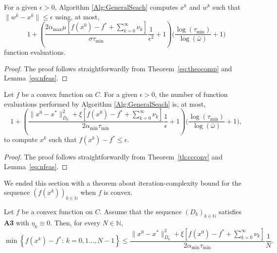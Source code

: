 \begin{theorem}
	For a given $\epsilon>0$, Algorithm \ref{Alg:GeneralSeach} computes $x^k$ and $w^k$ such that $\|  w^{k}-x^{k}\|\leq \epsilon$ using,  at most,
	$$1+\left({\frac{2{\alpha_{\max}}\mu\left[f(x^0)-f^* +\sum_{k= 0}^{\infty}\nu_k\right] }{\sigma \tau_{\min}}} \frac{1}{\epsilon^2}+1\right) \Big(\frac{\log (\tau_{\min})}{\log (\bar\omega)}+1\Big)$$
	function evaluations.

\end{theorem}
\begin{proof}
	The proof follows straightforwardly from Theorem~\ref{eq:theocomp} and Lemma~\ref{eq:nfeas}.
\end{proof}

\begin{theorem}
	Let $f$ be a convex function on $C$. For a given $\epsilon>0$, the number  of  function evaluations performed by  Algorithm \ref{Alg:GeneralSeach} is,  at most,
	$$1+\left(\frac{\|x^0 - x^*\|^2_{D_0} + \xi\left[f(x^0)-f^*+ \sum_{k=0}^{\infty} \nu_k\right]}{2 \alpha_{\min} \tau_{\min}}\frac{1}{\epsilon} + 1 \right)\Big(\frac{\log (\tau_{\min})}{\log (\bar\omega)}+1\Big),$$
	to compute $x^k$ such that $f(x^k) - f^*\leq \epsilon$.
\end{theorem}
\begin{proof}
	The proof follows straightforwardly from Theorem~\ref{th:ccconv} and  Lemma~\ref{eq:nfeas}.
\end{proof}
We ended this section with a  theorem about  iteration-complexity bound for the sequence $\left(f(x^k)\right)_{k\in\mathbb{N}}$ when $f$ is convex.
\begin{theorem} \label{th:ccconv}
	Let $f$ be a convex function on $C$. {Assume  that    the sequence $(D_k)_{k\in {\mathbb N}}$ satisfies {\bf A3} with $\eta_k\equiv 0$}. Then, for every $N \in \mathbb{N}$,
	$$
		\min \left\{f(x^k) - f^* :~k = 0, 1 \ldots, N-1\right\} \leq \frac{\|x^0 - x^*\|^2_{D_0} + \xi\left[f(x^0)-f^*+ \sum_{k=0}^{\infty} \nu_k\right]}{2 \alpha_{\min} \tau_{\min}}\frac{1}{N}.
	$$
\end{theorem}

